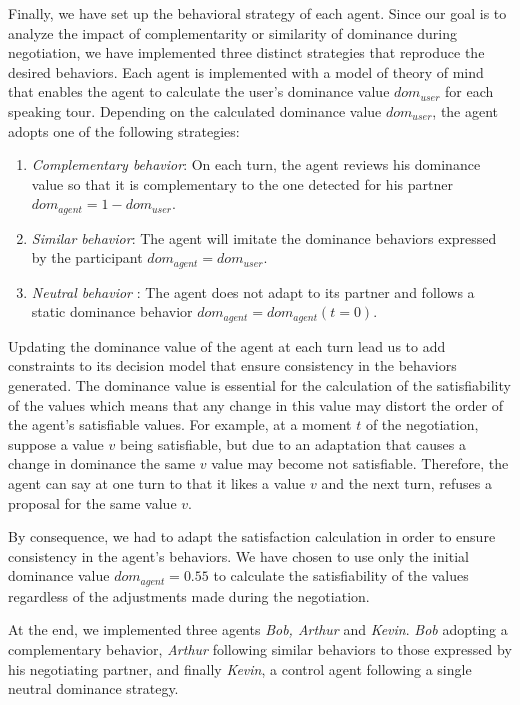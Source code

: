 \documentclass[10pt, a4paper, twocolumn]{article} %
\begin{document}
		Finally, we have set up the behavioral strategy of each agent. Since our goal is to analyze the impact of complementarity or similarity of dominance during negotiation, we have implemented three distinct strategies that reproduce the desired behaviors. 
		Each agent is implemented with a model of theory of mind that enables the agent to calculate the user's dominance value $dom_{user}$ for each speaking tour. Depending on the calculated dominance value $dom_{user}$, the agent adopts one of the following strategies:
		
		\begin{enumerate}
		\item \textit{Complementary behavior}: On each turn, the agent reviews his dominance value so that it is complementary to the one detected for his partner $dom_{agent}=1-dom_{user}$.
		
		\item \textit{Similar behavior}: The agent will imitate the dominance behaviors expressed by the participant $dom_{agent} = dom_{user}$.
		
		\item \textit{Neutral behavior} : The agent does not adapt to its partner and follows a static dominance behavior $dom_{agent} = dom_{agent} (t=0)$.
		
		
	\end{enumerate}
	
	Updating the dominance value of the agent at each turn lead us to add constraints to its decision model that ensure consistency in the behaviors generated. 
	The dominance value is essential for the calculation of the satisfiability of the values which means that any change in this value may distort the order of the agent's satisfiable values.
	For example, at a moment $t$ of the negotiation, suppose a value $v$ being satisfiable, but due to an adaptation that causes a change in dominance the same $v$ value may become not satisfiable. Therefore, the agent can say at one turn to that it likes a value $v$ and the next turn, refuses a proposal for the same value $v$.
	 
	By consequence, we had to adapt the satisfaction calculation in order to ensure consistency in the agent's behaviors. We have chosen to use only the initial dominance value $dom_{agent} = 0.55$ to calculate the satisfiability of the values regardless of the adjustments made during the negotiation.
	 
	At the end, we implemented three agents \emph{Bob, Arthur} and \emph{Kevin}. \emph{Bob} adopting a complementary behavior, \emph{Arthur} following similar behaviors to those expressed by his negotiating partner, and finally \emph{Kevin}, a control agent following a single neutral dominance strategy. 
	
\end{document}
